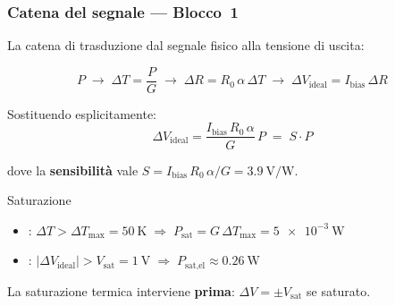 \begin{frame}
\frametitle{Catena del segnale --- Blocco~1}

La catena di trasduzione dal segnale fisico alla tensione di uscita:

\vspace{0.6em}
\[
  P \;\longrightarrow\;
  \Delta T = \frac{P}{G} \;\longrightarrow\;
  \Delta R = R_0\,\alpha\,\Delta T \;\longrightarrow\;
  \Delta V_\text{ideal} = I_\text{bias}\,\Delta R
\]

\vspace{0.5em}
Sostituendo esplicitamente:
\[
  \boxed{\Delta V_\text{ideal} = \frac{I_\text{bias}\,R_0\,\alpha}{G}\,P
         \;=\; S \cdot P}
\]

dove la \textbf{sensibilit\`a} vale $S = I_\text{bias}\,R_0\,\alpha / G
= \SI{3.9}{\volt\per\watt}$.

\vspace{0.4em}
\begin{block}{Saturazione}
  \begin{itemize}
    \item {}: $\Delta T > \Delta T_\text{max} = \SI{50}{\kelvin}
          \;\Rightarrow\; P_\text{sat} = G\,\Delta T_\text{max} = \SI{5e-3}{\watt}$
    \item {}: $|\Delta V_\text{ideal}| > V_\text{sat} = \SI{1}{\volt}
          \;\Rightarrow\; P_\text{sat,el} \approx \SI{0.26}{\watt}$
  \end{itemize}
  La saturazione termica interviene \textbf{prima}: $\Delta V = \pm V_\text{sat}$ se saturato.
\end{block}

\end{frame}

